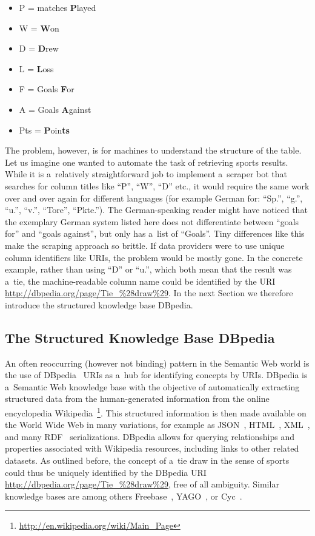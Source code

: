 \begin{itemize}
\item P = matches \textbf{P}layed
\item W = \textbf{W}on 
\item D = \textbf{D}rew
\item L = \textbf{L}oss
\item F = Goals \textbf{F}or
\item A = Goals \textbf{A}gainst
\item Pts = \textbf{P}oin\textbf{ts}
\end{itemize}

The problem, however, is for machines to understand the structure of the table.
Let us imagine one wanted to automate the task of retrieving sports results.
While it is a~relatively straightforward job to implement a~scraper bot that
searches for column titles like ``P'', ``W'', ``D'' etc.,
it would require the same work over and over again for different languages
(for example German for: ``Sp.'', ``g.'', ``u.'', ``v.'', ``Tore'', ``Pkte.'').
The German-speaking reader might have noticed that the exemplary German system listed here
does not differentiate between ``goals for'' and ``goals against'', but only has a~list of ``Goals''.
Tiny differences like this make the scraping approach so brittle.
If data providers were to use unique column identifiers like URIs, the problem would be mostly gone.
In the concrete example, rather than using ``D'' or ``u.'', which both mean that the result was a~tie,
the machine-readable column name could be identified by the URI
\url{http://dbpedia.org/page/Tie_%28draw%29}.
In the next Section we therefore introduce the structured knowledge base DBpedia.

\subsection{The Structured Knowledge Base DBpedia}
An often reoccurring (however not binding) pattern in the Semantic Web world
is the use of DBpedia~\cite{Bizer2007} URIs as a~hub for identifying concepts by URIs.
DBpedia is a~Semantic Web knowledge base with the objective of
automatically extracting structured data from the human-generated information from
the online encyclopedia Wikipedia~\footnote{\url{http://en.wikipedia.org/wiki/Main_Page}}.
This structured information is then made available on the World Wide Web in many variations,
for example as JSON~\cite{Crockford2006}, HTML~\cite{LeHors1999}, XML~\cite{Bray1998},
and many RDF~\cite{Klyne2004} serializations.
DBpedia allows for querying relationships and properties associated with Wikipedia resources,
including links to other related datasets.
As outlined before, the concept of a~tie draw in the sense of sports
could thus be uniquely identified by the DBpedia URI \url{http://dbpedia.org/page/Tie_%28draw%29},
free of all ambiguity.
Similar knowledge bases are among others Freebase~\cite{Markoff2007},
YAGO~\cite{Suchanek2007}, or Cyc~\cite{Wilkins1997}.

